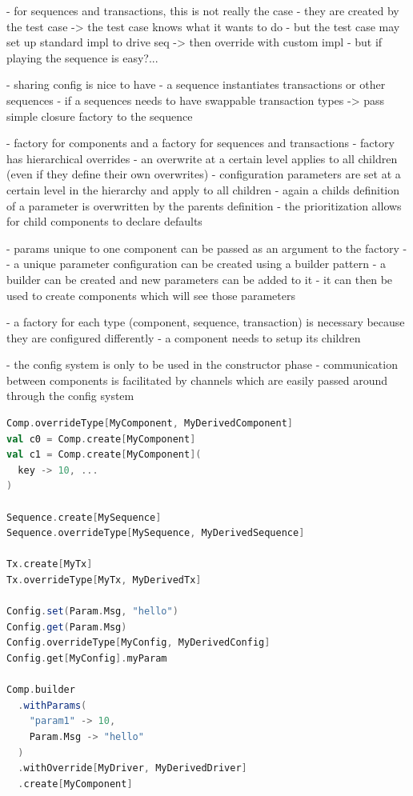- for sequences and transactions, this is not really the case
- they are created by the test case -> the test case knows what it wants to do
  - but the test case may set up standard impl to drive seq -> then override with custom impl
  - but if playing the sequence is easy?...



- sharing config is nice to have
- a sequence instantiates transactions or other sequences
- if a sequences needs to have swappable transaction types -> pass simple closure factory to the sequence







- factory for components and a factory for sequences and transactions
- factory has hierarchical overrides
- an overwrite at a certain level applies to all children (even if they define their own overwrites)
- configuration parameters are set at a certain level in the hierarchy and apply to all children
- again a childs definition of a parameter is overwritten by the parents definition
- the prioritization allows for child components to declare defaults

- params unique to one component can be passed as an argument to the factory
-
- a unique parameter configuration can be created using a builder pattern
- a builder can be created and new parameters can be added to it
- it can then be used to create components which will see those parameters

- a factory for each type (component, sequence, transaction) is necessary because they are configured differently
- a component needs to setup its children

- the config system is only to be used in the constructor phase
- communication between components is facilitated by channels which are easily passed around through the config system


\begin{listing}
\begin{lstlisting}[language=scala, captionpos=b, caption=\todo{???.},label=lst:factory]
Comp.overrideType[MyComponent, MyDerivedComponent]
val c0 = Comp.create[MyComponent]
val c1 = Comp.create[MyComponent](
  key -> 10, ...
)

Sequence.create[MySequence]
Sequence.overrideType[MySequence, MyDerivedSequence]

Tx.create[MyTx]
Tx.overrideType[MyTx, MyDerivedTx]

Config.set(Param.Msg, "hello")
Config.get(Param.Msg)
Config.overrideType[MyConfig, MyDerivedConfig]
Config.get[MyConfig].myParam

Comp.builder
  .withParams(
    "param1" -> 10,
    Param.Msg -> "hello"
  )
  .withOverride[MyDriver, MyDerivedDriver]
  .create[MyComponent]

\end{lstlisting}
\end{listing}

